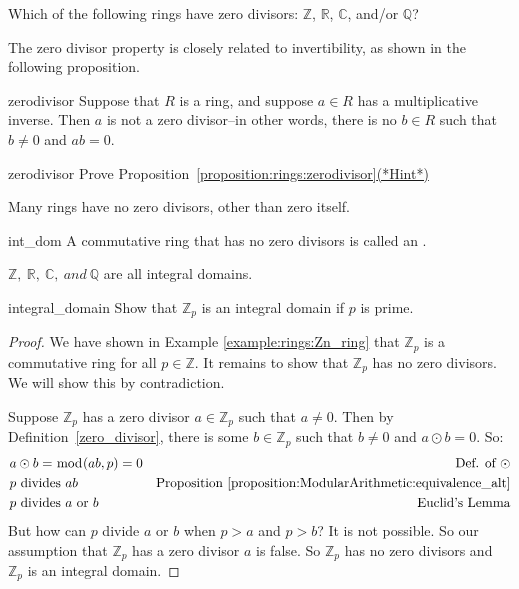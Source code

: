 \begin{exercise}{}
Which of the following rings have zero divisors: $\mathbb{Z}$, $\mathbb{R}$, $\mathbb{C}$, and/or $\mathbb{Q}$?
\end{exercise}

The zero divisor property is closely related to invertibility, as shown in the following proposition.

\begin{prop}{zerodivisor}
Suppose that $R$ is a ring, and suppose $a \in R$ has a multiplicative inverse. Then $a$ is not a zero divisor--in other words, there is no $b \in R$ such that $b\neq 0$ and $a   b = 0$.
\end{prop}

\begin{exercise}{zerodivisor}
Prove Proposition~\ref{proposition:rings:zerodivisor}\hyperref[ringsHints]{(*Hint*)} 
\end{exercise}

Many rings have no zero divisors, other than zero itself.

\begin{defn}{int_dom}
A commutative ring that has no zero divisors is called an .
\end{defn}

${\mathbb Z},~{\mathbb R},~{\mathbb C},~and~{\mathbb Q}$ are all integral domains.

\begin{example}{integral_domain}
Show that ${\mathbb Z}_p$ is an integral domain if $p$ is prime.

\begin{proof}
We have shown in Example \ref{example:rings:Zn_ring} that ${\mathbb Z}_p$ is a commutative ring for all $p\in{\mathbb Z}$.  It remains to show that ${\mathbb Z}_p$ has no zero divisors.  We will show this by contradiction.

Suppose ${\mathbb Z}_p$ has a zero divisor $a\in{\mathbb Z}_p$ such that $a\neq 0$.  Then by Definition~\ref{zero_divisor}, there is some $b\in{\mathbb Z}_p$ such that $b\neq 0$ and $a\odot b=0$.  So:
\begin{align*}
&a\odot b=\bmod(ab,p)=0 & \text{Def. of }\odot\\
&p \text{ divides } ab & \text{Proposition }\ref{proposition:ModularArithmetic:equivalence_alt}\\
&p \text{ divides } a \text{ or } b & \text{Euclid's Lemma}\\
\end{align*}
But how can $p$ divide $a$ or $b$ when $p>a$ and $p>b$?  It is not possible.  So our assumption that ${\mathbb Z}_p$ has a zero divisor $a$ is false.  So ${\mathbb Z}_p$ has no zero divisors and ${\mathbb Z}_p$ is an integral domain.
\end{proof}
\end{example}

